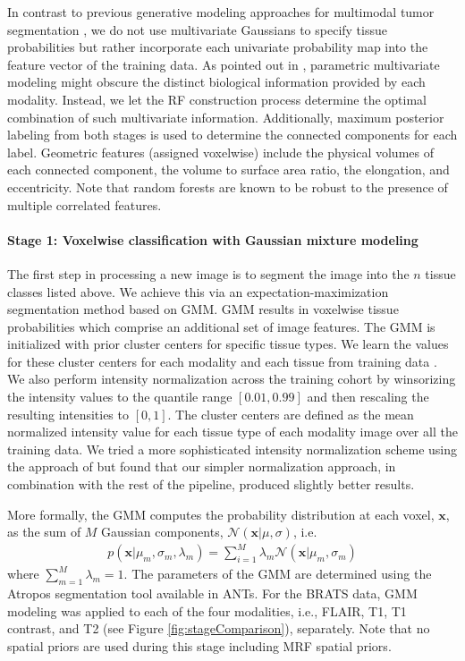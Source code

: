 \documentclass[preprint,authoryear,review,12pt]{elsarticle}
\begin{document}
In contrast to previous generative
modeling approaches for multimodal tumor segmentation 
\citep[e.g.,][]{prastawa2003}, we do not use multivariate 
Gaussians to specify tissue probabilities but rather incorporate each
univariate probability map into the feature vector of the training
data.  As pointed out in \cite{menze2010}, parametric multivariate modeling
might obscure the distinct biological information provided by each 
modality.  Instead, we let the RF construction 
process determine the optimal combination of such multivariate
information.  Additionally, maximum posterior labeling from both stages
is used to determine the connected components for each label.  
Geometric features (assigned voxelwise) include the physical volumes 
of each connected component, the volume to surface area ratio, 
the elongation, and eccentricity.  Note that random forests are
known to be robust to the presence of multiple correlated features.

\paragraph{Stage 1:  Voxelwise classification with Gaussian mixture
  modeling} 
The first step in processing a new image is to segment the image into
the $n$ tissue classes listed above.   We achieve this via an expectation-maximization
segmentation method based on
GMM.  GMM results in voxelwise
tissue probabilities which comprise an additional set of image
features.  The GMM is initialized with prior cluster centers for
specific tissue types.  We learn the values for these cluster centers
for each modality and each tissue from training data
\citep{reynolds2009}.  We also perform intensity normalization
across the training cohort by winsorizing the intensity values to the quantile
range $[0.01, 0.99]$ and then rescaling the resulting intensities to 
$[0, 1]$.  The cluster centers are defined as the mean
normalized intensity value for each tissue type of each modality 
image over all the training data.  We tried a more sophisticated intensity
normalization scheme using the approach of \cite{nyul2000} but found that
our simpler normalization approach, in combination with the rest of the
pipeline, produced slightly better results.  

More formally, the GMM computes the 
probability distribution at each voxel, $\mathbf{x}$, as the
sum of $M$ Gaussian components, $\mathcal{N}(\mathbf{x}|\mu,\sigma)$, i.e.
\begin{align}
p\left(\mathbf{x}|\mu_m,\sigma_m,\lambda_m\right) = \sum_{i=1}^M \lambda_m \mathcal{N}(\mathbf{x}|\mu_m,\sigma_m)
\end{align}
where $\sum_{m=1}^M \lambda_m = 1$.  The parameters of the GMM 
are determined using the Atropos segmentation tool \citep{avants2011} available in ANTs.
For the BRATS data, GMM modeling was applied to each of the four modalities, i.e.,
FLAIR, T1, T1 contrast, and T2 (see Figure \ref{fig:stageComparison}), separately.  
Note that no spatial priors are used during this stage including MRF spatial priors.
\end{document}
